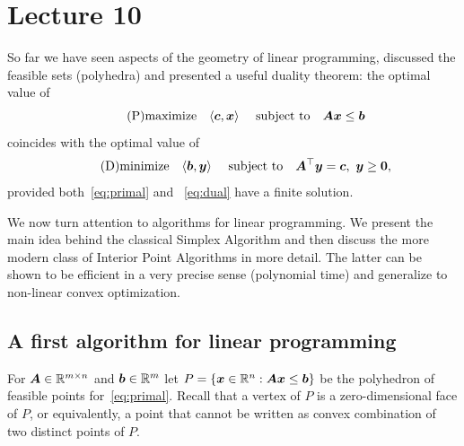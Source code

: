 %
%
% 


\chapter*{Lecture 10}
\setcounter{chapter}{10}
\setcounter{section}{0}
\setcounter{equation}{0}
\setcounter{theorem}{0}


So far we have seen aspects of the geometry of linear programming, discussed the feasible sets (polyhedra) and presented a useful duality theorem:
the optimal value of
\begin{equation}\label{eq:primal}\tag{P}
 \text{maximize}\quad \langle {\bm{c}}, {\bm{x}} \rangle \ \quad\text{subject to}\quad \bm{A}\bm{x}\leq \bm{b}
\end{equation}
coincides with the optimal value of
\begin{equation}\label{eq:dual}\tag{D}
 \text{minimize}\quad \langle {\bm{b}}, {\bm{y}} \rangle \ \quad\text{subject to}\quad \bm{A}^{\top}\bm{y}=\bm{c}, \  \bm{y}\geq \bm{0},
\end{equation}
provided both~\eqref{eq:primal} and ~\eqref{eq:dual} have a finite solution. 

We now turn attention to algorithms for linear programming. We present the main idea behind the classical Simplex Algorithm and then discuss the more modern class of Interior Point Algorithms in more detail. The latter can be shown to be efficient in a very precise sense (polynomial time) and generalize to non-linear convex optimization.

\section{A first algorithm for linear programming}
For $\bm{A}\in \mathbb{R}^{m\times n}$ and $\bm{b}\in \mathbb{R}^m$ let $P=\{\bm{x}\in \mathbb{R}^n\mathrel{\mathop{:}} \bm{A}\bm{x}\leq \bm{b}\}$ be the polyhedron of feasible points for~\eqref{eq:primal}. Recall that a vertex of $P$ is a zero-dimensional face of $P$, or equivalently, a point that cannot be written as convex combination of two distinct points of $P$.

